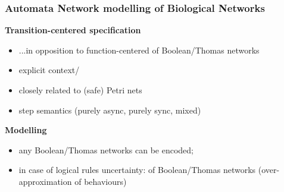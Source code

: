 \begin{frame}
\frametitle{Automata Network modelling of Biological Networks}
\textbf{Transition-centered specification}
\begin{itemize}
\item ...in opposition to function-centered of Boolean/Thomas networks
\item explicit context/ 
\item closely related to (safe) Petri nets
\item step semantics (purely async, purely sync, mixed)
\end{itemize}
\textbf{Modelling}
\begin{itemize}
\item any Boolean/Thomas networks can be encoded;
\item in case of logical rules uncertainty:  of Boolean/Thomas networks (over-approximation of behaviours)
\end{itemize}
\end{frame}
